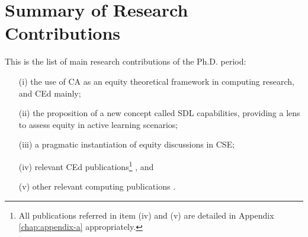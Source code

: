 \section{Summary of Research Contributions}
\label{intro-sec:sum-contributions}

This is the list of main research contributions of the \gls{Ph.D.} period:
\begin{enumerate}
    \item[(i)] the use of \acrfull{CA} as an equity theoretical framework in computing research, and \acrfull{CEd} mainly;
    \item[(ii)] the proposition of a new concept called \acrfull{SDL} capabilities, providing a lens to assess equity in active learning scenarios;
    \item[(iii)] a pragmatic instantiation of equity discussions in \acrfull{CSE};
    \item[(iv)] relevant \gls{CEd} publications\footnote{All publications referred in item (iv) and (v) are detailed in Appendix \ref{chap:appendix-a} appropriately.} \cite{bispojr:2024-isdls,bispojr:2024-nmp,bispojr:2024-urca,   feitosa:2024,cavalcanti:2024,pereira:2024,melo:2024-horizontes,boaventura:2024-sbgames,boaventura:2023,esmeraldo:2023,freire:2023-rsc,freire:2023-encompif, santos:2022,bispojr:2022-educomp,esmeraldo:2022,bispojr:2021,bispojr:2021-educomp,bispojr:2021-wei,bispojr:2020-tec}, and
    \item[(v)] other relevant computing publications \cite{bispojr:2024-online-lab,cavalcanti:2024-ieee,bispojr:2023-edi,bispojr:2023-rbie,sansil:2023,bispojr:2022-snee,lima:2022}.
\end{enumerate}

                

        

        
